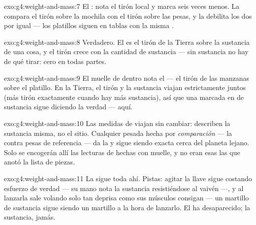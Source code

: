 \begin{solution}{exo:g4:weight-and-mass:7}
El : nota el tirón local y marca seis veces menos. La
 compara el tirón sobre la mochila con el tirón sobre las
pesas, y la  debilita los dos por igual --- los platillos siguen
en tablas con la misma .
\end{solution}

\begin{solution}{exo:g4:weight-and-mass:8}
Verdadero. El  es el tirón de la Tierra sobre la sustancia de una
cosa, y el tirón crece con la cantidad de sustancia --- sin sustancia
no hay de qué tirar:  cero en todas partes.
\end{solution}

\begin{solution}{exo:g4:weight-and-mass:9}
El muelle de dentro nota el \emph{} --- el tirón de las manzanas
sobre el platillo. En la Tierra, el tirón y la sustancia viajan
estrictamente juntos (más tirón exactamente cuando hay más
sustancia), así que una  marcada en  de sustancia
sigue diciendo la verdad --- aquí.
\end{solution}

\begin{solution}{exo:g4:weight-and-mass:10}
Las medidas de  viajan sin cambiar: describen la sustancia misma,
no el sitio. Cualquier pesada hecha por \emph{comparación} --- la
 contra pesas de referencia --- da la  y sigue siendo
exacta cerca del planeta lejano. Solo se encogerán allí las lecturas
de  hechas con muelle, y no eran esas las que anotó la lista de
piezas.
\end{solution}

\begin{solution}{exo:g4:weight-and-mass:11}
La  sigue toda ahí. Pistas: agitar la llave sigue costando
esfuerzo de verdad --- su mano nota la sustancia resistiéndose al
vaivén ---, y al lanzarla sale volando solo tan deprisa como sus
músculos consigan --- un martillo de sustancia sigue siendo un
martillo a la hora de lanzarlo. El  ha desaparecido; la
sustancia, jamás.
\end{solution}
